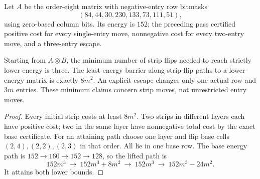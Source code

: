 Let $A$ be the order-eight matrix with negative-entry row bitmasks
\[
 (84,44,30,230,133,73,111,51),
\]
using zero-based column bits. Its energy is $152$; the preceding pass
certified positive cost for every single-entry move, nonnegative cost
for every two-entry move, and a three-entry escape.
\begin{proposition}
\label{prop:exchanges-strip-barrier}
Starting from $A\otimes B$, the minimum number of strip flips needed
to reach strictly lower energy is three. The least energy barrier along
strip-flip paths to a lower-energy matrix is exactly $8m^2$.
An explicit escape changes only one actual row and $3m$ entries.
These minimum claims concern strip moves, not unrestricted entry moves.
\end{proposition}
\begin{proof}
Every initial strip costs at least $8m^2$. Two strips in different layers
each have positive cost; two in the same layer have nonnegative total
cost by the exact base certificate. For an attaining path choose one
layer and flip base cells $(2,4),(2,2),(2,3)$ in that order. All lie in
one base row. The base energy path is
$152\to160\to152\to128$, so the lifted path is
\[
 152m^3\ \longrightarrow\ 152m^3+8m^2\
 \longrightarrow\ 152m^3\
 \longrightarrow\ 152m^3-24m^2.
\]
It attains both lower bounds.
\end{proof}

